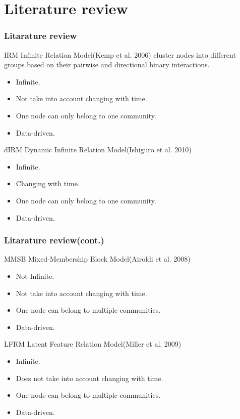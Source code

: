 \documentclass{beamer}
\begin{document}

\section{Literature review}

\begin{frame}
\frametitle{Litarature review}
\begin{block}{IRM}
Infinite Relation Model(Kemp et al. 2006) cluster nodes into different groups based on their pairwise and directional binary interactions.
\begin{itemize}
\item Infinite.
\item Not take into account changing with time.
\item One node can only belong to one community.
\item Data-driven.
\end{itemize}
\end{block}

\begin{block}{dIRM}
Dynamic Infinite Relation Model(Ishiguro et al. 2010)
\begin{itemize}
\item Infinite.
\item Changing with time.
\item One node can only belong to one community.
\item Data-driven.
\end{itemize}
\end{block}

\end{frame}


\begin{frame}
\frametitle{Litarature review(cont.)}
\begin{block}{MMSB}
Mixed-Membership Block Model(Airoldi et al. 2008)
\begin{itemize}
\item Not Infinite.
\item Not take into account changing with time.
\item One node can belong to multiple communities.
\item Data-driven.
\end{itemize}
\end{block}

\begin{block}{LFRM}
Latent Feature Relation Model(Miller et al. 2009)
\begin{itemize}
\item Infinite.
\item Does not take into account changing with time.
\item One node can belong to multiple communities.
\item Data-driven.
\end{itemize}
\end{block}

\end{frame}
\end{document}

